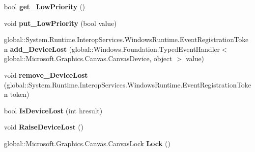 \begin{DoxyCompactItemize}
\item 
\mbox{\label{class_microsoft_1_1_graphics_1_1_canvas_1_1_canvas_device_a95f4876747bf8ac6c5fd2b67a83fed4f}} 
bool {\bfseries get\+\_\+\+Low\+Priority} ()
\item 
\mbox{\label{class_microsoft_1_1_graphics_1_1_canvas_1_1_canvas_device_ad1a2be7ca3c55a404a27d0e562278094}} 
void {\bfseries put\+\_\+\+Low\+Priority} (bool value)
\item 
\mbox{\label{class_microsoft_1_1_graphics_1_1_canvas_1_1_canvas_device_a631e1f27d9faf64d8b1ee234ffde2ed8}} 
global\+::\+System.\+Runtime.\+Interop\+Services.\+Windows\+Runtime.\+Event\+Registration\+Token {\bfseries add\+\_\+\+Device\+Lost} (global\+::\+Windows.\+Foundation.\+Typed\+Event\+Handler$<$ global\+::\+Microsoft.\+Graphics.\+Canvas.\+Canvas\+Device, object $>$ value)
\item 
\mbox{\label{class_microsoft_1_1_graphics_1_1_canvas_1_1_canvas_device_a4a4a0a58940cbe69bb830cd13b27e86c}} 
void {\bfseries remove\+\_\+\+Device\+Lost} (global\+::\+System.\+Runtime.\+Interop\+Services.\+Windows\+Runtime.\+Event\+Registration\+Token token)
\item 
\mbox{\label{class_microsoft_1_1_graphics_1_1_canvas_1_1_canvas_device_aa2c3386bb9c17effeb042c9f84c8037c}} 
bool {\bfseries Is\+Device\+Lost} (int hresult)
\item 
\mbox{\label{class_microsoft_1_1_graphics_1_1_canvas_1_1_canvas_device_a39809eaa6b66baebd35c08254533482e}} 
void {\bfseries Raise\+Device\+Lost} ()
\item 
\mbox{\label{class_microsoft_1_1_graphics_1_1_canvas_1_1_canvas_device_a4f5edc7899938d055a969c1fcb3a3404}} 
global\+::\+Microsoft.\+Graphics.\+Canvas.\+Canvas\+Lock {\bfseries Lock} ()
\item 
\mbox{\label{class_microsoft_1_1_graphics_1_1_canvas_1_1_canvas_device_a9a79960381076f722b1ecba748e5ef20}} 

\end{DoxyCompactItemize}
